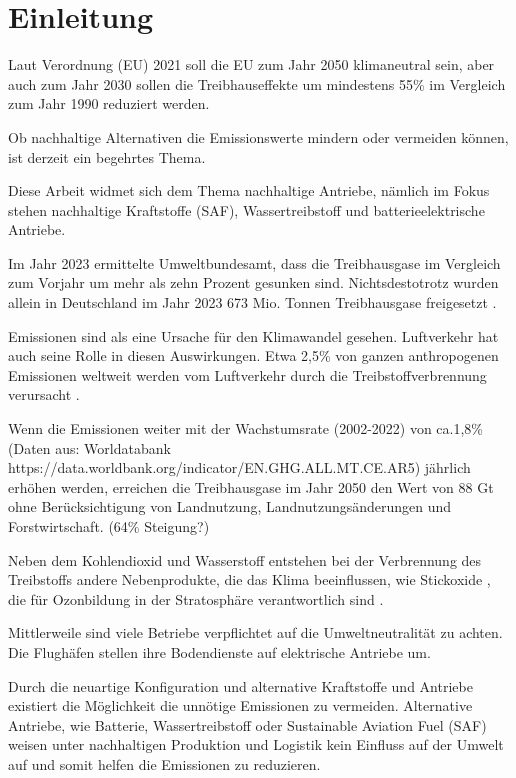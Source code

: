 \chapter{Einleitung}
\label{ch:Einleitung}



Laut Verordnung (EU) 2021 soll die EU zum Jahr 2050 klimaneutral sein, aber auch zum Jahr 2030 sollen die Treibhauseffekte um mindestens 55\%
im Vergleich zum Jahr 1990 reduziert werden. 

Ob nachhaltige Alternativen die Emissionswerte mindern oder vermeiden können, ist derzeit ein begehrtes Thema. 

Diese Arbeit widmet sich dem Thema nachhaltige Antriebe, nämlich im Fokus stehen nachhaltige Kraftstoffe (SAF), Wassertreibstoff und 
batterieelektrische Antriebe.
 
Im Jahr 2023 ermittelte Umweltbundesamt, dass die Treibhausgase im Vergleich zum Vorjahr um mehr als zehn Prozent gesunken sind.
Nichtsdestotrotz wurden allein in Deutschland im Jahr 2023 673 Mio. Tonnen Treibhausgase freigesetzt \cite{bundesregierung}.

 Emissionen sind als eine Ursache für den Klimawandel gesehen. Luftverkehr hat auch seine Rolle in diesen Auswirkungen. 
Etwa 2,5\% von ganzen anthropogenen  Emissionen weltweit werden vom Luftverkehr
durch die Treibstoffverbrennung verursacht \cite{conrady2019luftverkehr}.


Wenn die Emissionen weiter mit der Wachstumsrate (2002-2022) von ca.1,8\% (Daten aus: Worldatabank https://data.worldbank.org/indicator/EN.GHG.ALL.MT.CE.AR5) 
jährlich erhöhen werden, erreichen die Treibhausgase im Jahr 2050 den Wert von 88 Gt ohne Berücksichtigung von Landnutzung, 
Landnutzungsänderungen und Forstwirtschaft. (64\% Steigung?)

Neben dem Kohlendioxid  und Wasserstoff  entstehen bei der Verbrennung des Treibstoffs andere Nebenprodukte, die 
das Klima beeinflussen, wie Stickoxide , die für Ozonbildung in der Stratosphäre verantwortlich sind \cite{conrady2019luftverkehr}.

Mittlerweile sind viele Betriebe verpflichtet auf die Umweltneutralität zu achten. Die Flughäfen stellen ihre Bodendienste auf elektrische Antriebe um.

Durch die neuartige Konfiguration und alternative Kraftstoffe und Antriebe existiert die Möglichkeit die unnötige Emissionen zu vermeiden.
Alternative Antriebe, wie Batterie, Wassertreibstoff oder Sustainable Aviation Fuel (SAF) weisen unter nachhaltigen Produktion und Logistik kein Einfluss 
auf der Umwelt auf und somit helfen die Emissionen zu reduzieren. 



